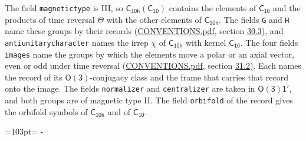\documentclass[10pt,a4paper]{article}
\newcommand{\needspace}[1]{\par\penalty-100\begingroup\dimen0=#1\relax\dimen2=\pagegoal
  \advance\dimen2-\pagetotal\ifdim\dimen0>\dimen2\relax\ifdim\dimen2>0pt\vfil\break\fi\fi
  \endgroup}
\numberwithin{equation}{section}
\newcommand{\grp}[1]{\mathsf{#1}}
\begin{document}
The field \texttt{magnetictype} is III, so $\grp{C_{10h}}(\grp{C_{10}})$ contains the elements of $\grp{C_{10}}$ and the products of time reversal $\varTheta$ with the other elements of $\grp{C_{10h}}$. The fields \texttt{G} and \texttt{H} name these groups by their records (\href{../../CONVENTIONS.pdf}{CONVENTIONS.pdf}, section \href{../../CONVENTIONS.pdf\#conv.30.3}{30.3}), and \texttt{antiunitarycharacter} names the irrep $\chi$ of $\grp{C_{10h}}$ with kernel $\grp{C_{10}}$. The four fields \texttt{images} name the groups by which the elements move a polar or an axial vector, even or odd under time reversal (\href{../../CONVENTIONS.pdf}{CONVENTIONS.pdf}, section \href{../../CONVENTIONS.pdf\#conv.31.2}{31.2}). Each names the record of its $\grp{O(3)}$-conjugacy class and the frame that carries that record onto the image. The fields \texttt{normalizer} and \texttt{centralizer} are taken in $\grp{O(3)1'}$, and both groups are of magnetic type II. The field \texttt{orbifold} of the record gives the orbifold symbols of $\grp{C_{10h}}$ and of $\grp{C_{10}}$.
\needspace{103pt}
\end{document}

